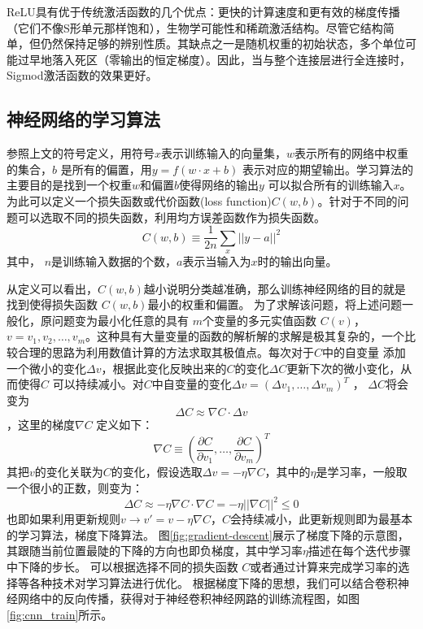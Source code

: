 ReLU具有优于传统激活函数的几个优点：更快的计算速度和更有效的梯度传播（它们不像S形单元那样饱和），生物学可能性和稀疏激活结构。尽管它结构简单，但仍然保持足够的辨别性质。其缺点之一是随机权重的初始状态，多个单位可能过早地落入死区（零输出的恒定梯度）。因此，当与整个连接层进行全连接时，Sigmod激活函数的效果更好。

\subsection{神经网络的学习算法}
参照上文的符号定义，用符号$x $表示训练输入的向量集，$w$表示所有的网络中权重的集合，$b$ 是所有的偏置，用$y=f(w\cdot x + b)$ 表示对应的期望输出。学习算法的主要目的是找到一个权重$w$和偏置$b$使得网络的输出$y$ 可以拟合所有的训练输入$x$。为此可以定义一个损失函数或代价函数(loss function)$C(w,b)$。针对于不同的问题可以选取不同的损失函数，利用均方误差函数作为损失函数。
\begin{equation}
C(w,b)\equiv \frac{1}{2n}\sum_x||y-a||^2
\label{equ:loss_mse}
\end{equation}
其中， $n$是训练输入数据的个数，$a$表示当输入为$x$时的输出向量。

从定义可以看出，$C(w,b) $越小说明分类越准确，那么训练神经网络的目的就是找到使得损失函数 $C(w,b)$最小的权重和偏置。
为了求解该问题，将上述问题一般化，原问题变为最小化任意的具有 $m $个变量的多元实值函数 $C(v) $， $v=v_1,v_2,\dots,v_m $。这种具有大量变量的函数的解析解的求解是极其复杂的，一个比较合理的思路为利用数值计算的方法求取其极值点。每次对于$C $中的自变量 添加一个微小的变化$\Delta v $，根据此变化反映出来的$C $的变化$\Delta C $更新下次的微小变化，从而使得$C $ 可以持续减小。对$C $中自变量的变化$\Delta v=(\Delta v_1,\dots,\Delta v_m)^T $ ， $\Delta C $将会变为
\begin{equation}
    \Delta C \approx \nabla C \cdot \Delta v
    \label{equ:gradient1}
\end{equation}
，这里的梯度$\nabla C $ 定义如下：
\begin{equation}
\nabla C \equiv (\frac{\partial C}{\partial v_1},\dots,\frac{\partial C}{\partial v_m})^T
\end{equation}
其把$v$的变化关联为$C$的变化，假设选取$\Delta v=-\eta \nabla C $，其中的$\eta $是学习率，一般取一个很小的正数，则变为：
\begin{equation}
\Delta C \approx -\eta\nabla C\cdot\nabla C=-\eta||\nabla C||^2 \leq 0
\end{equation}
也即如果利用更新规则$v \rightarrow v'=v-\eta \nabla C$，$C$会持续减小，此更新规则即为最基本的学习算法，梯度下降算法。
图\ref{fig:gradient-descent}展示了梯度下降的示意图，其跟随当前位置最陡的下降的方向也即负梯度，其中学习率$ \eta $描述在每个迭代步骤中下降的步长。
可以根据选择不同的损失函数 $C $或者通过计算来完成学习率的选择等各种技术对学习算法进行优化。
根据梯度下降的思想，我们可以结合卷积神经网络中的反向传播，获得对于神经卷积神经网路的训练流程图，如图\ref{fig:cnn_train}所示。


